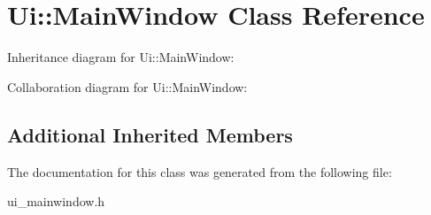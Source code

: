 \hypertarget{classUi_1_1MainWindow}{}\section{Ui\+:\+:Main\+Window Class Reference}
\label{classUi_1_1MainWindow}


Inheritance diagram for Ui\+:\+:Main\+Window\+:


Collaboration diagram for Ui\+:\+:Main\+Window\+:
\subsection*{Additional Inherited Members}


The documentation for this class was generated from the following file\+:\begin{DoxyCompactItemize}
\item 
ui\+\_\+mainwindow.\+h\end{DoxyCompactItemize}
